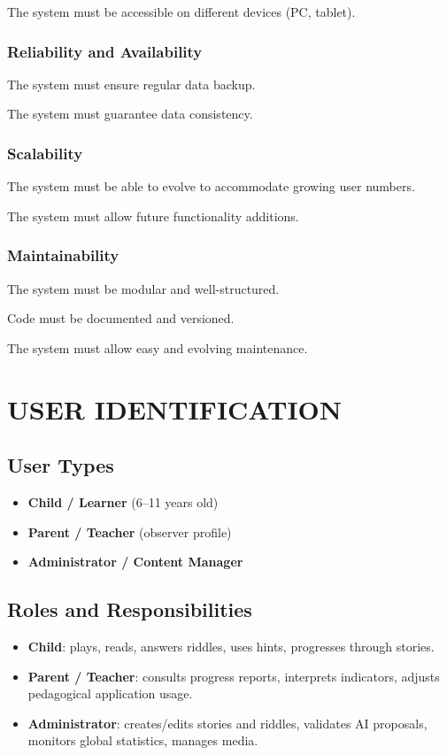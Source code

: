 \documentclass[12pt,a4paper]{article}
\begin{document}
The system must be accessible on different devices (PC, tablet).

\subsubsection{Reliability and Availability}

The system must ensure regular data backup.

The system must guarantee data consistency.

\subsubsection{Scalability}

The system must be able to evolve to accommodate growing user numbers.

The system must allow future functionality additions.

\subsubsection{Maintainability}

The system must be modular and well-structured.

Code must be documented and versioned.

The system must allow easy and evolving maintenance.


\section{USER IDENTIFICATION}

\subsection{User Types}

\begin{itemize}
    \item \textbf{Child / Learner} (6--11 years old)
    \item \textbf{Parent / Teacher} (observer profile)
    \item \textbf{Administrator / Content Manager}
\end{itemize}

\subsection{Roles and Responsibilities}

\begin{itemize}
    \item \textbf{Child}: plays, reads, answers riddles, uses hints, progresses through stories.
    \item \textbf{Parent / Teacher}: consults progress reports, interprets indicators, adjusts pedagogical application usage.
    \item \textbf{Administrator}: creates/edits stories and riddles, validates AI proposals, monitors global statistics, manages media.
\end{itemize}
\end{document}
